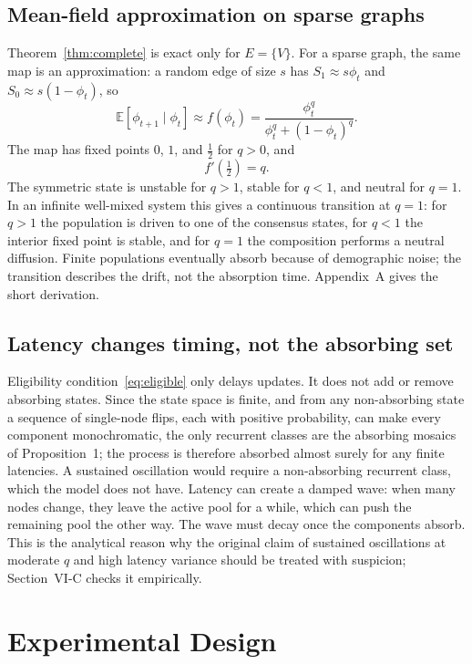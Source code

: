 \documentclass[conference]{IEEEtran}
\newcommand{\E}{\mathbb{E}}
\begin{document}
\subsection{Mean-field approximation on sparse graphs}
Theorem~\ref{thm:complete} is exact only for $E=\{V\}$. For a sparse graph, the same map is an approximation: a random edge of size $s$ has $S_1\approx s\phi_t$ and $S_0\approx s(1-\phi_t)$, so
\begin{equation}
\E[\phi_{t+1}\mid\phi_t]\approx f(\phi_t)
=\frac{\phi_t^{q}}{\phi_t^{q}+(1-\phi_t)^{q}} .
\label{eq:meanfield}
\end{equation}
The map has fixed points $0$, $1$, and $\tfrac12$ for $q>0$, and
\begin{equation}
f'\!\left(\tfrac12\right)=q .
\label{eq:derivative}
\end{equation}
The symmetric state is unstable for $q>1$, stable for $q<1$, and neutral for $q=1$. In an infinite well-mixed system this gives a continuous transition at $q=1$: for $q>1$ the population is driven to one of the consensus states, for $q<1$ the interior fixed point is stable, and for $q=1$ the composition performs a neutral diffusion. Finite populations eventually absorb because of demographic noise; the transition describes the drift, not the absorption time. Appendix~A gives the short derivation.

\subsection{Latency changes timing, not the absorbing set}
Eligibility condition~\eqref{eq:eligible} only delays updates. It does not add or remove absorbing states. Since the state space is finite, and from any non-absorbing state a sequence of single-node flips, each with positive probability, can make every component monochromatic, the only recurrent classes are the absorbing mosaics of Proposition~1; the process is therefore absorbed almost surely for any finite latencies. A sustained oscillation would require a non-absorbing recurrent class, which the model does not have. Latency can create a damped wave: when many nodes change, they leave the active pool for a while, which can push the remaining pool the other way. The wave must decay once the components absorb. This is the analytical reason why the original claim of sustained oscillations at moderate $q$ and high latency variance should be treated with suspicion; Section~VI-C checks it empirically.

\section{Experimental Design}
\end{document}
